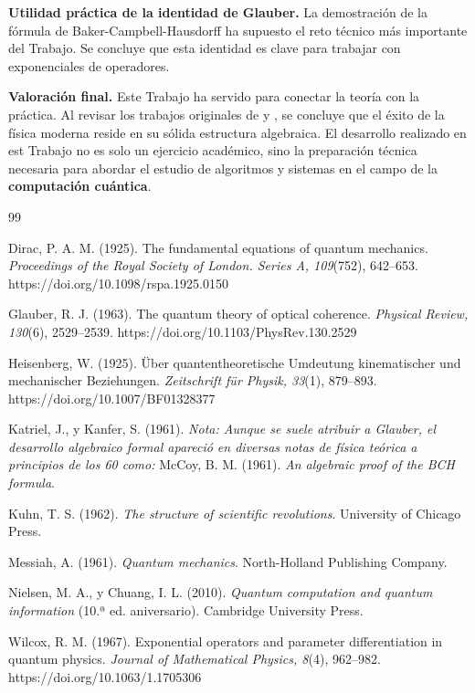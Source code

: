 \documentclass[11pt,a4paper,spanish]{book}
\begin{document}
\textbf{Utilidad práctica de la identidad de Glauber.} 
La demostración de la fórmula de Baker-Campbell-Hausdorff ha supuesto el reto técnico más importante del Trabajo. Se concluye que esta identidad es clave para trabajar con exponenciales de operadores.

\textbf{Valoración final.} 
Este Trabajo ha servido para conectar la teoría con la práctica. Al revisar los trabajos originales de \cite{heisenberg1925} y \cite{dirac1925}, se concluye que el éxito de la física moderna reside en su sólida estructura algebraica. El desarrollo realizado en est Trabajo no es solo un ejercicio académico, sino la preparación técnica necesaria para abordar el estudio de algoritmos y sistemas en el campo de la \textbf{computación cuántica}.

\begin{thebibliography}{99}

Dirac, P. A. M. (1925). The fundamental equations of quantum mechanics. \emph{Proceedings of the Royal Society of London. Series A, 109}(752), 642--653. https://doi.org/10.1098/rspa.1925.0150

Glauber, R. J. (1963). The quantum theory of optical coherence. \emph{Physical Review, 130}(6), 2529--2539. https://doi.org/10.1103/PhysRev.130.2529

Heisenberg, W. (1925). Über quantentheoretische Umdeutung kinematischer und mechanischer Beziehungen. \emph{Zeitschrift für Physik, 33}(1), 879--893. https://doi.org/10.1007/BF01328377

Katriel, J., y Kanfer, S. (1961). \emph{Nota: Aunque se suele atribuir a Glauber, el desarrollo algebraico formal apareció en diversas notas de física teórica a principios de los 60 como:} McCoy, B. M. (1961). \emph{An algebraic proof of the BCH formula}.

Kuhn, T. S. (1962). \emph{The structure of scientific revolutions}. University of Chicago Press.

Messiah, A. (1961). \emph{Quantum mechanics}. North-Holland Publishing Company.

Nielsen, M. A., y Chuang, I. L. (2010). \emph{Quantum computation and quantum information} (10.ª ed. aniversario). Cambridge University Press.

Wilcox, R. M. (1967). Exponential operators and parameter differentiation in quantum physics. \emph{Journal of Mathematical Physics, 8}(4), 962--982. https://doi.org/10.1063/1.1705306

\end{thebibliography}
% 
%
\end{document}
